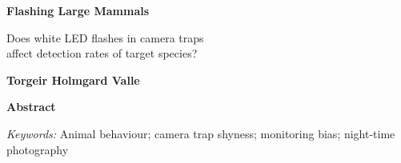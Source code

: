 \thispagestyle{plain}
\begin{center}
	\Large
	\textbf{Flashing Large Mammals}
	
	\vspace{0.4cm}
	\large
	Does white LED flashes in camera traps \\
	affect detection rates of target species?
	
	\vspace{0.4cm}
	\textbf{Torgeir Holmgard Valle}
	
	\vspace{0.9cm}
	\textbf{Abstract}
\end{center}

















\textit{Keywords:} 
Animal behaviour; %
camera trap shyness; %
monitoring bias; %
night-time photography %


